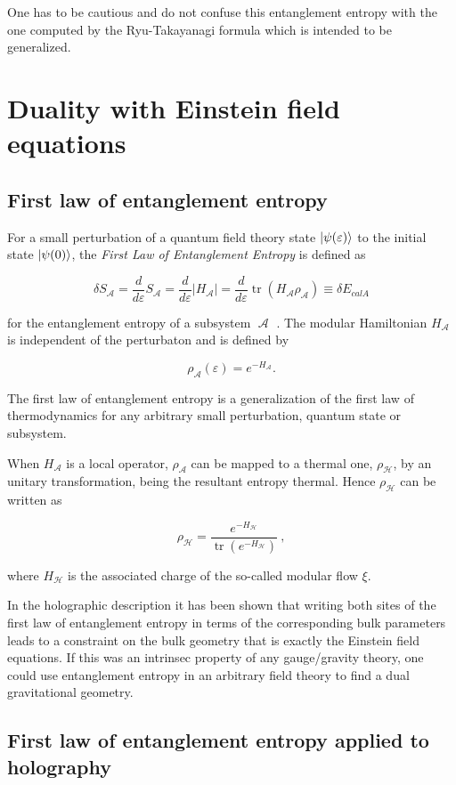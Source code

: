 \documentclass[lettersize,journal]{IEEEtran}
\providecommand{\abs}[1]{\lvert#1\rvert}
\providecommand{\eq}[2]{
    \begin{equation}
        #2
    \label{eq:#1}
    \end{equation}
}
\DeclareMathOperator{\calA}{\mathcal{A}}
\DeclareMathOperator{\calH}{\mathcal{H}}
\DeclareMathOperator{\tr}{tr}
\begin{document}
One has to be cautious and do not confuse this entanglement entropy with the one computed by the Ryu-Takayanagi formula which is intended to be generalized.








\section{Duality with Einstein field equations} \label{s:EQ}

\subsection{First law of entanglement entropy} \label{ss:FLEE}

For a small perturbation of a quantum field theory state $\ket{\psi(\varepsilon)}$ to the initial state $\ket{\psi(0)}$, the \textit{First Law of Entanglement Entropy} is defined as
\eq{FLEE}{
    \delta S_{\calA} = \frac{d}{d \varepsilon} S_{\calA} = \frac{d}{d \varepsilon} \abs{H_{\calA}} = \frac{d}{d \varepsilon} \tr (H_{\calA} \rho_{\calA}) \equiv \delta E_{calA}
}
for the entanglement entropy of a subsystem $\calA$ \cite{fareghbal_first_2019}. The modular Hamiltonian $H_{\calA}$ is independent of the perturbaton and is defined by
\eq{modularH}{
    \rho_{\calA} (\varepsilon) = e^{-H_{\calA}}.
}

The first law of entanglement entropy is a generalization of the first law of thermodynamics for any arbitrary small perturbation, quantum state or subsystem.

When $H_{\calA}$ is a local operator, $\rho_{\calA}$ can be mapped to a thermal one, $\rho_{\calH}$, by an unitary transformation, being the resultant entropy thermal. Hence $\rho_{\calH}$ can be written as
\eq{modularH2}{
    \rho_{\calH} = \frac{e^{-H_{\calH}}}{\tr (e^{-H_{\calH}})} \ ,
}
where $H_{\calH}$ is the associated charge of the so-called modular flow $\xi$.

In the holographic description \cite{fareghbal_first_2019} it has been shown that writing both sites of the first law of entanglement entropy in terms of the corresponding bulk parameters leads to a constraint on the bulk geometry that is exactly the Einstein field equations. If this was an intrinsec property of any gauge/gravity theory, one could use entanglement entropy in an arbitrary field theory to find a dual gravitational geometry.

\subsection{First law of entanglement entropy applied to holography} \label{ss:FLEE_H}
\end{document}
